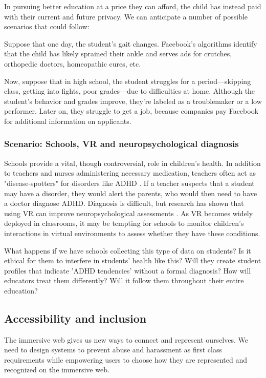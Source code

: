 In pursuing better education at a price they can afford, the child has instead paid with their current and future privacy. We can anticipate a number of possible scenarios that could follow:

Suppose that one day, the student's gait changes. Facebook's algorithms identify that the child has likely sprained their ankle and serves ads for crutches, orthopedic doctors, homeopathic cures, etc.

Now, suppose that in high school, the student struggles for a period---skipping class, getting into fights, poor grades---due to difficulties at home. Although the student's behavior and grades improve, they're labeled as a troublemaker or a low performer. Later on, they struggle to get a job, because companies pay Facebook for additional information on applicants.

\subsubsection{Scenario: Schools, VR and neuropsychological diagnosis}

Schools provide a vital, though controversial, role in children's health. In addition to teachers and nurses administering necessary medication, teachers often act as "disease-spotters" for disorders like ADHD \cite{phillips2006medicine}. If a teacher suspects that a student may have a disorder, they would alert the parents, who would then need to have a doctor diagnose ADHD. Diagnosis is difficult, but research has shown that using VR can improve neuropsychological assessments \cite{areces2018analysis}. As VR becomes widely deployed in classrooms, it may be tempting for schools to monitor children's interactions in virtual environments to assess whether they have these conditions.

What happens if we have schools collecting this type of data on students? Is it ethical for them to interfere in students' health like this? Will they create student profiles that indicate 'ADHD tendencies' without a formal diagnosis? How will educators treat them differently? Will it follow them throughout their entire education?

\subsection{Accessibility and inclusion}

The immersive web gives us new ways to connect and represent ourselves. We need to design systems to prevent abuse and harassment as first class requirements while empowering users to choose how they are represented and recognized on the immersive web.

